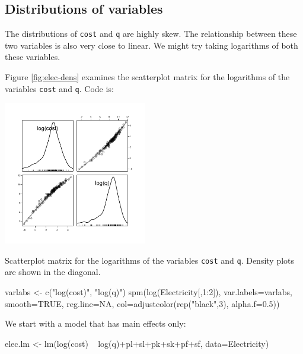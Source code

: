 \documentclass{tufte-book}\usepackage[]{graphicx}\usepackage[]{color}
\newcommand{\txtt}[1]{\texttt{#1}}
\begin{document}
\subsection*{Distributions of variables}

The distributions of \texttt{cost} and \texttt{q} are highly skew.
The relationship between these two variables is also very close to
linear.  We might try taking logarithms of both these variables.

Figure \ref{fig:elec-dens} examines the scatterplot matrix for the
logarithms of the variables \txtt{cost} and \txtt{q}.
\noindent
Code is:
\begin{marginfigure}
\begin{Schunk}


\centerline{\includegraphics[width=0.47\textwidth]{figs/11-spm-cost-q-1} }

\end{Schunk}
  \caption{Scatterplot matrix for the logarithms of the variables
    \txtt{cost} and \txtt{q}. Density plots are shown in the
    diagonal.\label{fig:elec-dens}}
\end{marginfigure}
\begin{Schunk}
\begin{Sinput}
varlabs <- c("log(cost)", "log(q)")
spm(log(Electricity[,1:2]), var.labels=varlabs,
    smooth=TRUE, reg.line=NA,
    col=adjustcolor(rep("black",3), alpha.f=0.5))
\end{Sinput}
\end{Schunk}
We start with a model that has main effects only:
\begin{Schunk}
\begin{Sinput}
elec.lm <- lm(log(cost) ~ log(q)+pl+sl+pk+sk+pf+sf,
              data=Electricity)
\end{Sinput}
\end{Schunk}
\end{document}
